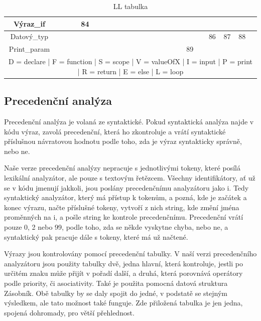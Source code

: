 \documentclass[11pt, a4paper]{article}
\begin{document}
\begin{table}[h]
{{\begin{tabular}{|c|c|c|c|c|c|c|c|c|c|c|c|c|c|c|c|c|c|c|c|c|c|c|}
				Výraz\_if           &         &          &       & 84 &    &    &     &    &    &       &       &        &     &      &      &    &     &         &         &        &        &    \\ \hline
				Datový\_typ         &         &          &       &    &    &    &     &    &    &       &       &        &     &      &      &    &     &         & 86      & 87     & 88     &    \\ \hline
				Print\_param        &         &          &       &    &    &    &     &    &    &       &       &        &     &      &      &    & 89  &         &         &        &        &    \\ \hline
				\multicolumn{23}{c}{D = declare | F = function | S = scope | V = valueOfX | I = input | P = print | R = return | E = else | L = loop }
			\end{tabular}
			}}
			\caption{LL tabulka}
			\label{gramatika}
		\end{table}

\subsection{Precedenční analýza}

Precedenční analýza je volaná ze syntaktické. Pokud syntaktická analýza najde v kódu výraz, zavolá precedenční, která ho zkontroluje a vrátí syntaktické příslušnou návratovou hodnotu podle toho, zda je výraz syntakticky správně, nebo ne.

Naše verze precedenční analýzy nepracuje s jednotlivými tokeny, které posílá lexikální analyzátor, ale pouze s textovým řetězcem. Všechny identifikátory, ať už se v kódu jmenují jakkoli, jsou poslány precedenčnímu analyzátoru jako i. Tedy syntaktický analyzátor, který má přístup k tokenům, a pozná, kde je začátek a konec výrazu, načte příslušné tokeny, vytvoří z nich string, kde změní jména proměnných na i, a pošle string ke kontrole precedenčnímu. Precedenční vrátí pouze 0, 2 nebo 99, podle toho, zda se někde vyskytne chyba, nebo ne, a syntaktický pak pracuje dále s tokeny, které má už načtené.

Výrazy jsou kontrolovány pomocí precedenční tabulky. V naší verzi precedenčního analyzátoru jsou použity tabulky dvě, jedna hlavní, která kontroluje, jestli po určitém znaku může přijít v pořadí další, a druhá, která porovnává operátory podle priority, či asociativity. Také je použita pomocná datová struktura Zásobník. Obě tabulky by se daly spojit do jedné, v podstatě se stejným výsledkem, ale tato možnost také funguje. Zde přiložená tabulka je jen jedna, spojená dohromady, pro větší přehlednost.
\end{document}
